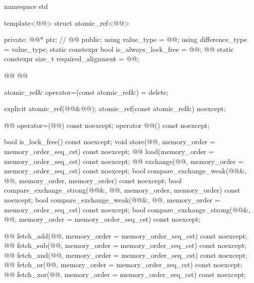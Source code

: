 \begin{codeblock}
namespace std {
  template<@@> struct atomic_ref<@@> {
  private:
    @@* ptr;        // \expos
    @@
  public:
    using value_type = @@;
    using difference_type = value_type;
    static constexpr bool is_always_lock_free = @@;
    @@
    static constexpr size_t required_alignment = @@;

    @@
    @@

    atomic_ref& operator=(const atomic_ref&) = delete;

    explicit atomic_ref(@@&@@);
    atomic_ref(const atomic_ref&) noexcept;

    @@ operator=(@@) const noexcept;
    operator @@() const noexcept;

    bool is_lock_free() const noexcept;
    void store(@@, memory_order = memory_order_seq_cst) const noexcept;
    @@ load(memory_order = memory_order_seq_cst) const noexcept;
    @@ exchange(@@,
                      memory_order = memory_order_seq_cst) const noexcept;
    bool compare_exchange_weak(@@&, @@,
                               memory_order, memory_order) const noexcept;
    bool compare_exchange_strong(@@&, @@,
                                 memory_order, memory_order) const noexcept;
    bool compare_exchange_weak(@@&, @@,
                               memory_order = memory_order_seq_cst) const noexcept;
    bool compare_exchange_strong(@@&, @@,
                                 memory_order = memory_order_seq_cst) const noexcept;

    @@ fetch_add(@@,
                       memory_order = memory_order_seq_cst) const noexcept;
    @@ fetch_sub(@@,
                       memory_order = memory_order_seq_cst) const noexcept;
    @@ fetch_and(@@,
                       memory_order = memory_order_seq_cst) const noexcept;
    @@ fetch_or(@@,
                      memory_order = memory_order_seq_cst) const noexcept;
    @@ fetch_xor(@@,
                       memory_order = memory_order_seq_cst) const noexcept;

}}
\end{codeblock}

